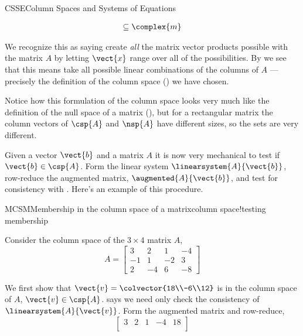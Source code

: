 \begin{subsect}{CSSE}{Column Spaces and Systems of Equations}
\begin{para}
\begin{align*}
\subseteq\complex{m}
\end{align*}
\end{para}
%
\begin{para}We recognize this as saying create {\em all} the matrix vector products possible with the matrix $A$ by letting $\vect{x}$ range over all of the possibilities.  By  we see that this means take all possible linear combinations of the columns of $A$ --- precisely the definition of the column space () we have chosen.\end{para}
%
\begin{para}Notice how this formulation of the column space looks very much like the definition of the null space of a matrix (), but for a rectangular matrix the column vectors of $\csp{A}$ and $\nsp{A}$ have different sizes, so the sets are very different.\end{para}
%
\begin{para}Given a vector $\vect{b}$ and a matrix $A$ it is now very mechanical to test if $\vect{b}\in\csp{A}$.  Form the linear system $\linearsystem{A}{\vect{b}}$, row-reduce the augmented matrix, $\augmented{A}{\vect{b}}$, and test for consistency with .  Here's an example of this procedure.\end{para}
%
%
\begin{example}{MCSM}{Membership in the column space of a matrix}{column space!testing membership}
\begin{para}Consider the column space of the $3\times 4$ matrix $A$,
%
\begin{equation*}
A=
\begin{bmatrix}
3 & 2 & 1 & -4\\
-1 & 1 & -2 & 3\\
2 & -4 & 6 & -8
\end{bmatrix}
\end{equation*}
\end{para}
%
\begin{para}We first show that $\vect{v}=\colvector{18\\-6\\12}$ is in the column space of $A$, $\vect{v}\in\csp{A}$.   says we need only check the consistency of $\linearsystem{A}{\vect{v}}$.  Form the augmented matrix and row-reduce,
%
\begin{equation*}
\begin{bmatrix}
3 & 2 & 1 & -4 & 18\\

\end{bmatrix}
\end{equation*}
\end{para}
\end{example}
\end{subsect}
